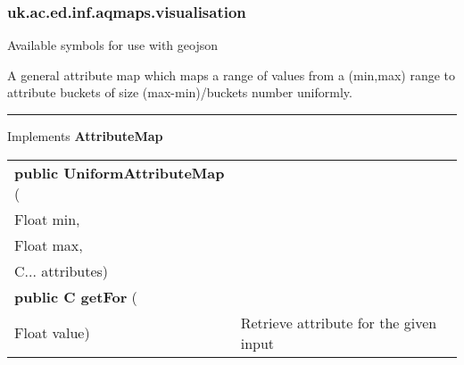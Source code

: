 \subsubsection{ uk.ac.ed.inf.aqmaps.visualisation }
 { Available symbols for use with geojson
 
}
 { A general attribute map which maps a range of values from a (min,max) range to attribute buckets of size (max{-}min)/buckets number uniformly.
 
\vspace*{4pt} \hrule \vspace*{3pt}
Implements \textbf{ AttributeMap }
\begin{tabular}{ p{3in}|m{3.4in}}
\textbf{public UniformAttributeMap } (\\ \hspace*{ 5pt} Float min,\\\hspace*{ 5pt} Float max,\\\hspace*{ 5pt} C... attributes) & \\ \hline 
\textbf{public C getFor } (\\ \hspace*{ 5pt} Float value) & Retrieve attribute for the given input\\ \hline 
\end{tabular}
}
